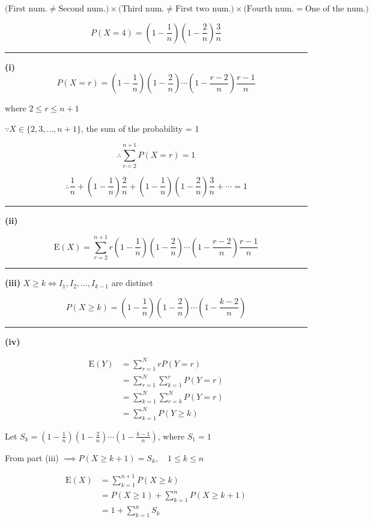 \documentclass[12pt]{article}
\begin{document}
\newcommand{\ds}{\displaystyle}

$\bigl( \text{First num.} \neq \text{Second num.} \bigr)\times \bigl( \text{Third num.} \neq \text{First two num.} \bigr)\times \bigl( \text{Fourth num.} = \text{One of the num.} \bigr)$

$$P(X=4)=\left(1-\frac1n\right)\left(1-\frac2n\right)\frac3n$$

\bigskip\hrule\bigskip

\textbf{(i)}
$$P(X=r)=\left(1-\frac1n\right)\left(1-\frac2n\right)\cdots\left(1-\frac{r-2}{n}\right)\frac{r-1}{n}$$

where $2\leq r\leq n+1$

$\because X\in\{2,3,\dots,n+1\}$, the sum of the probability = 1

$$\therefore \sum_{r=2}^{n+1}P(X=r)=1$$

$$\therefore \frac1n+\left(1-\frac1n\right)\frac2n+\left(1-\frac1n\right)\left(1-\frac2n\right)\frac3n+\cdots=1$$

\bigskip\hrule\bigskip

\textbf{(ii)}

$$\boxed{\mathrm{E}(X)=\sum_{r=2}^{n+1}r\left(1-\frac1n\right)\left(1-\frac2n\right)\cdots\left(1-\frac{r-2}{n}\right)\frac{r-1}{n}}$$

\bigskip\hrule\bigskip

\textbf{(iii)} $\ds X\geq k\iff I_1,I_2,\dots,I_{k-1}$ are distinct

$$\boxed{P(X\geq k)=\left(1-\frac1n\right)\left(1-\frac2n\right)\cdots\left(1-\frac{k-2}{n}\right)}$$

\bigskip\hrule\bigskip

\textbf{(iv)}

\begin{align*}
\mathrm{E}(Y)
&=\sum_{r=1}^{N}rP(Y=r)\\
&=\sum_{r=1}^{N}\sum_{k=1}^{r}P(Y=r)\\
&=\sum_{k=1}^{N}\sum_{r=k}^{N}P(Y=r)\\
&=\sum_{k=1}^{N}P(Y\geq k)
\end{align*}

Let $\ds S_k=\left(1-\frac1n\right)\left(1-\frac2n\right)\cdots\left(1-\frac{k-1}{n}\right)$, where $S_1=1$

From part (iii) $\implies \ds P(X\geq k+1)=S_k,\quad 1\leq k\leq n$

\begin{align*}
\mathrm{E}(X)
&=\sum_{k=1}^{n+1}P(X\geq k)\\
&=P(X\geq1)+\sum_{k=1}^{n}P(X\geq k+1)\\
&=1+\sum_{k=1}^{n}S_k
\end{align*}
\end{document}
